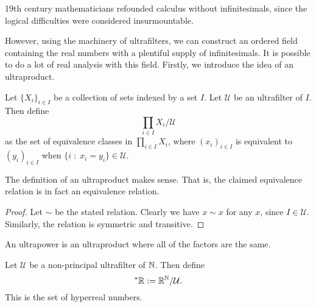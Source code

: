 19th century mathematicians refounded calculus without infinitesimals,
since the logical difficulties were considered insurmountable.

However, using the machinery of ultrafilters, we can construct
an ordered field containing the real numbers with a plentiful
supply of infinitesimals. It is possible to do a lot of real analysis with this
field. Firstly, we introduce the idea of an ultraproduct.
\begin{definition}
    Let $\{X_i\}_{i \in I}$ be a collection of sets indexed by a set $I$. 
    Let $\mathcal{U}$ be an ultrafilter of $I$. Then define
    \begin{equation*}
        \prod_{i\in I} X_i/\mathcal{U}
    \end{equation*}
    as the set of equivalence classes in $\prod_{i \in I} X_i$, where
    $(x_i)_{i \in I}$ is equivalent to $(y_i)_{i \in I}$
    when $\{ i\;:\;x_i = y_i\} \in \mathcal{U}$.
\end{definition}

\begin{proposition}
    The definition of an ultraproduct makes sense. That is, the claimed
    equivalence relation is in fact an equivalence relation.
\end{proposition}
\begin{proof}
    Let $\sim$ be the stated relation. Clearly we have $x \sim x$
    for any $x$, since $I \in \mathcal{U}$. Similarly, the relation
    is symmetric and transitive.
\end{proof}

An ultrapower is an ultraproduct where all of the factors are the same.
\begin{definition}
    Let $\mathcal{U}$ be a non-principal ultrafilter of $\mathbb{N}$. Then define
    \begin{equation*}
        ^*\mathbb{R} := \mathbb{R}^{\mathbb{N}}/\mathcal{U}.
    \end{equation*}
    This is the set of hyperreal numbers.
\end{definition}
